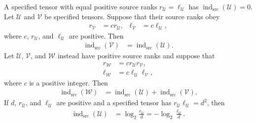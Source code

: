 \begin{lemma}
    \label{thm:mpu_specified_source_index_identities}
    \leanok
    A specified tensor with equal positive source ranks
    $r_{\mathcal U}=\ell_{\mathcal U}$ has
    $\operatorname{ind}_{\mathrm{src}}(\mathcal U)=0$.
    Let $\mathcal U$ and $\mathcal V$ be specified tensors. Suppose that their
    source ranks obey
    \begin{align}
        r_{\mathcal V}    & =c r_{\mathcal U},   &
        \ell_{\mathcal V} & =c\ell_{\mathcal U},
    \end{align}
    where $c$, $r_{\mathcal U}$, and $\ell_{\mathcal U}$ are positive. Then
    \begin{align}
        \operatorname{ind}_{\mathrm{src}}(\mathcal V)
         & =\operatorname{ind}_{\mathrm{src}}(\mathcal U).
    \end{align}
    Let $\mathcal U$, $\mathcal V$, and $\mathcal W$ instead have positive
    source ranks and suppose that
    \begin{align}
        r_{\mathcal W}    & =c r_{\mathcal U}r_{\mathcal V},      \\
        \ell_{\mathcal W} & =c\ell_{\mathcal U}\ell_{\mathcal V},
    \end{align}
    where $c$ is a positive integer. Then
    \begin{align}
        \operatorname{ind}_{\mathrm{src}}(\mathcal W)
         & =\operatorname{ind}_{\mathrm{src}}(\mathcal U)
        +\operatorname{ind}_{\mathrm{src}}(\mathcal V).
    \end{align}
    If $d$, $r_{\mathcal U}$, and $\ell_{\mathcal U}$ are positive and a
    specified tensor has $r_{\mathcal U}\ell_{\mathcal U}=d^2$, then
    \begin{align}
        \operatorname{ind}_{\mathrm{src}}(\mathcal U)
         & =\log_2\frac{r_{\mathcal U}}d
        =-\log_2\frac{\ell_{\mathcal U}}d.
    \end{align}
\end{lemma}

